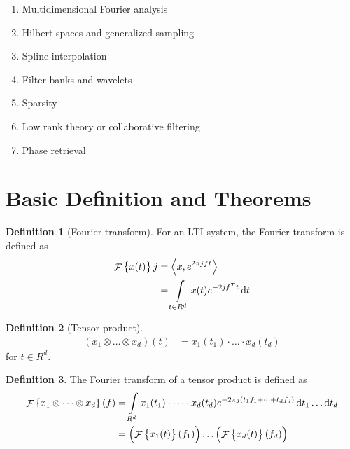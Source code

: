 \documentclass[titlepage, fleqn, a4paper, 12pt, twoside]{article}
\theoremstyle{definition}
\newtheorem{definition}{Definition}
\theoremstyle{theorem}
\DeclareMathOperator{\FT}{\mathcal{F}}
\begin{document}
\begin{enumerate}
	\item Multidimensional Fourier analysis
	\item Hilbert spaces and generalized sampling
	\item Spline interpolation
	\item Filter banks and wavelets
	\item Sparsity
	\item Low rank theory or collaborative filtering
	\item Phase retrieval
\end{enumerate}

\clearpage
{}

\part{Basic Definition and Theorems}

\begin{definition}[Fourier transform]
	For an LTI system, the Fourier transform is defined as
	\begin{align*}
		\FT\left\{ x(t) \right\}j &= \left\langle x,e^{2 \pi j f t} \right\rangle\\
		&= \int\limits_{t \in R^d} x(t) e^{-2 j f^T t} \dif t
	\end{align*}
	\label{def:Fourier_transform}
\end{definition}

\begin{definition}[Tensor product]
	\begin{align*}
		(x_1 \otimes \dots \otimes x_d)(t) &= x_1(t_1) \cdot \dots \cdot x_d(t_d)
	\end{align*}
	for $t \in R^d$.
\end{definition}

\begin{definition}
	The Fourier transform of a tensor product is defined as
	\begin{align*}
		\FT\left\{ x_1 \otimes \dots \otimes x_d \right\}(f) &= \int\limits_{R^d} x_1(t_1) \cdot \dots \cdot x_d(t_d) e^{-2 \pi j (t_1 f_1 + \dots + t_d f_d)} \dif t_1 \dots \dif t_d\\
		&= \left( \FT\left\{ x_1(t) \right\}(f_1) \right) \dots \left( \FT\left\{ x_d(t) \right\}(f_d) \right)
	\end{align*}
\end{definition}
\end{document}
